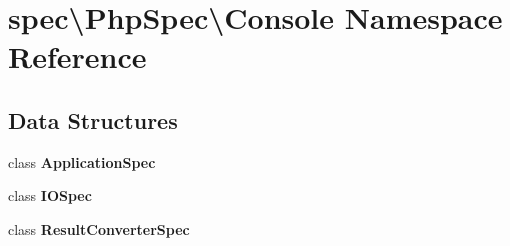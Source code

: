 \section{spec\textbackslash{}Php\+Spec\textbackslash{}Console Namespace Reference}
\label{namespacespec_1_1_php_spec_1_1_console}
\subsection*{Data Structures}
\begin{DoxyCompactItemize}
\item 
class {\bf Application\+Spec}
\item 
class {\bf I\+O\+Spec}
\item 
class {\bf Result\+Converter\+Spec}
\end{DoxyCompactItemize}
